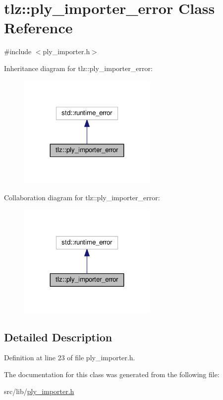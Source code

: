 \hypertarget{classtlz_1_1ply__importer__error}{}\section{tlz\+:\+:ply\+\_\+importer\+\_\+error Class Reference}
\label{classtlz_1_1ply__importer__error}


{\ttfamily \#include $<$ply\+\_\+importer.\+h$>$}



Inheritance diagram for tlz\+:\+:ply\+\_\+importer\+\_\+error\+:
\nopagebreak
\begin{figure}[H]
\begin{center}
\leavevmode
\includegraphics[width=191pt]{classtlz_1_1ply__importer__error__inherit__graph}
\end{center}
\end{figure}


Collaboration diagram for tlz\+:\+:ply\+\_\+importer\+\_\+error\+:
\nopagebreak
\begin{figure}[H]
\begin{center}
\leavevmode
\includegraphics[width=191pt]{classtlz_1_1ply__importer__error__coll__graph}
\end{center}
\end{figure}


\subsection{Detailed Description}


Definition at line 23 of file ply\+\_\+importer.\+h.



The documentation for this class was generated from the following file\+:\begin{DoxyCompactItemize}
\item 
src/lib/\hyperlink{ply__importer_8h}{ply\+\_\+importer.\+h}\end{DoxyCompactItemize}
